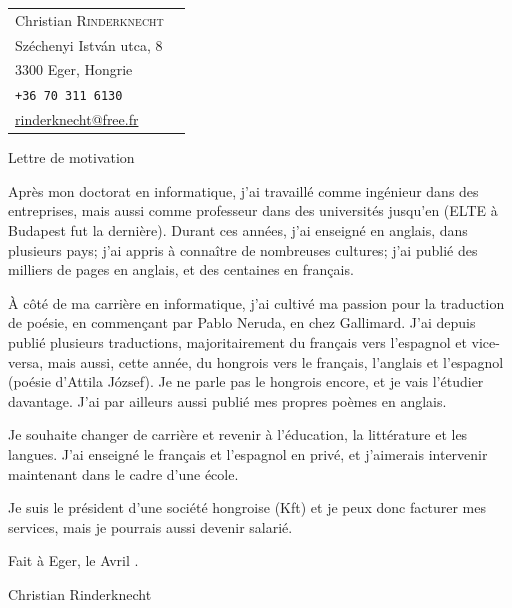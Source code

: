 \documentclass[a4paper,11pt]{article}
\begin{document}
\noindent
\begin{tabular}{@{}l@{\qquad\qquad\qquad}r@{}}
  Christian \textsc{Rinderknecht}
  & \\
  Széchenyi István utca, 8
  & \\
  3300 Eger, Hongrie \\
  \texttt{+36 70 311 6130} \\
  \url{rinderknecht@free.fr}
\end{tabular}

\bigskip

\begin{center}
  \large Lettre de motivation
\end{center}

\bigskip

Après mon doctorat en informatique, j'ai travaillé comme ingénieur
dans des entreprises, mais aussi comme professeur dans des universités
jusqu'en  (ELTE à Budapest fut la dernière). Durant
ces années, j'ai enseigné en anglais, dans plusieurs pays; j'ai appris
à connaître de nombreuses cultures; j'ai publié des milliers de pages
en anglais, et des centaines en français.

À côté de ma carrière en informatique, j'ai cultivé ma passion pour la
traduction de poésie, en commençant par Pablo Neruda, en
 chez Gallimard. J'ai depuis publié plusieurs
traductions, majoritairement du français vers l'espagnol et
vice\hyp{}versa, mais aussi, cette année, du hongrois vers le
français, l'anglais et l'espagnol (poésie d'Attila József). Je ne
parle pas le hongrois encore, et je vais l'étudier davantage. J'ai par
ailleurs aussi publié mes propres poèmes en anglais.

Je souhaite changer de carrière et revenir à l'éducation, la
littérature et les langues. J'ai enseigné le français et l'espagnol en
privé, et j'aimerais intervenir maintenant dans le cadre d'une école.

Je suis le président d'une société hongroise (Kft) et je peux donc
facturer mes services, mais je pourrais aussi devenir salarié.

\bigskip
\bigskip

\hfill Fait à Eger, le  Avril .

\bigskip
\bigskip
\bigskip
\bigskip
\hfill Christian Rinderknecht

\bigskip
\end{document}
